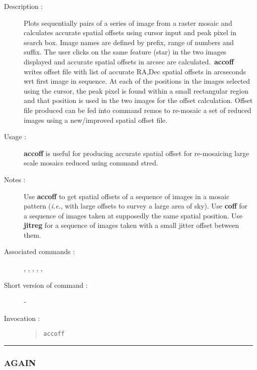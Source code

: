 \begin{description}

\item[Description :] Plots sequentially pairs of a series of image from
a raster mosaic and calculates accurate spatial offsets using cursor
input and peak pixel in search box.  Image names are defined by prefix,
range of numbers and suffix.  The user clicks on the same feature
(star) in the two images displayed and accurate spatial offsets in
arcsec are calculated.\ {\bf accoff} writes offset file with list of
accurate RA,Dec spatial offsets in arcseconds wrt first image in
sequence. At each of the positions in the images selected using the
cursor, the peak pixel is found within a small rectangular region and
that position is used in the two images for the offset calculation.
Offset file produced can be fed into command remos to re-mosaic a set
of reduced images using a new/improved spatial offset file.

\item[Usage :] {\bf accoff} is useful for producing accurate spatial offset for
re-mosaicing large scale mosaics reduced using command stred.

\item[Notes :] Use {\bf accoff} to get spatial offsets of a sequence of images
in a mosaic pattern (\emph{i.e.}, with large offsets to survey a large
area of sky).  Use {\bf coff} for a sequence of images taken at supposedly the
same spatial position. Use {\bf jitreg} for a sequence of images taken with a
small jitter offset between them.

\item[Associated commands :] {\tt {}},
{\tt {}}, {\tt {}},
{\tt {}}, {\tt {}},
{\tt {}}
\item[Short version of command :] -
\item[Invocation :]

\begin{quote}{\tt accoff }\end{quote}

\end{description}

\hrule
\subsubsection*{\label{AGAIN}AGAIN}

